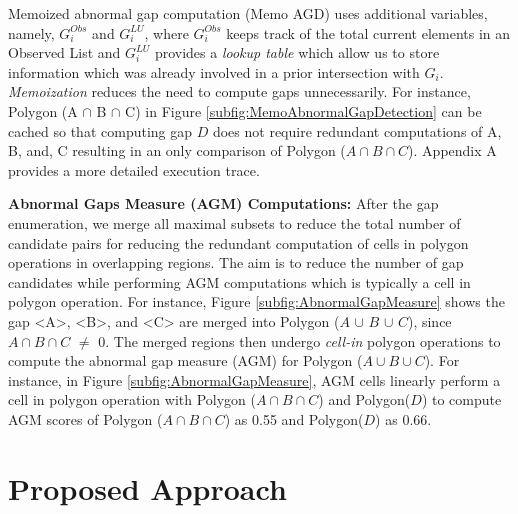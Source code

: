 \documentclass[acmsmall]{acmart}
\begin{document}
Memoized abnormal gap computation (Memo AGD) uses additional variables, namely, $G_{i}^{Obs}$ and $G_{i}^{LU}$, where $G_{i}^{Obs}$ keeps track of the total current elements in an Observed List and $G_{i}^{LU}$ provides a \textit{lookup table} which allow us to store information which was already involved in a prior intersection with $G_{i}$. \textit{Memoization} reduces the need to compute gaps unnecessarily. For instance, Polygon (A $\cap$ B $\cap$ C) in Figure \ref{subfig:MemoAbnormalGapDetection} can be cached so that computing gap $D$ does not require redundant computations of A, B, and, C resulting in an only comparison of Polygon ($A \cap B \cap C$). Appendix A provides a more detailed execution trace.


\textbf{Abnormal Gaps Measure (AGM) Computations:} After the gap enumeration, we merge all maximal subsets to reduce the total number of candidate pairs for reducing the redundant computation of cells in polygon operations in overlapping regions. The aim is to reduce the number of gap candidates while performing AGM computations which is typically a cell in polygon operation. For instance, Figure \ref{subfig:AbnormalGapMeasure} shows the gap <A>, <B>, and <C> are merged into Polygon ($A$ $\cup$ $B$ $\cup$ $C$), since $A \cap B \cap C$ $\neq$ 0. The merged regions then undergo \textit{cell-in} polygon operations to compute the abnormal gap measure (AGM) for Polygon ($A \cup B \cup C$). For instance, in Figure \ref{subfig:AbnormalGapMeasure}, AGM cells linearly perform a cell in polygon operation with Polygon ($A \cap B \cap C$) and Polygon($D$) to compute AGM scores of Polygon ($A \cap B \cap C$) as 0.55 and Polygon($D$) as 0.66.
\section{Proposed Approach}
\label{section:SpaceTimeAware}
\end{document}
